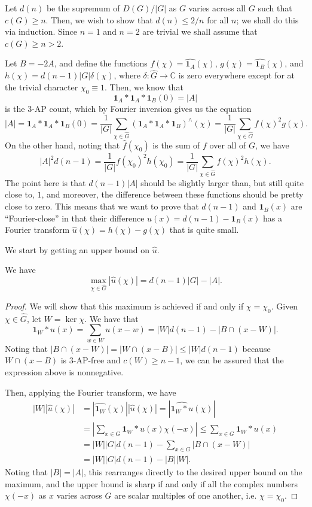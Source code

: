 \documentclass[10pt]{scrartcl}
\providecommand{\CC}{\mathbb C}
\providecommand{\ind}[1]{\mathbf 1_{#1}}
\providecommand{\abs}[1]{\left|{#1}\right|}
\renewcommand{\hat}{\widehat}
\begin{document}
Let $d(n)$ be the supremum of $D(G)/|G|$ as $G$ varies across all $G$
such that $c(G)\ge n$. Then, we wish to show that $d(n)\le 2/n$ for all $n$;
we shall do this via induction.
Since $n=1$ and $n=2$ are trivial we shall assume that $c(G)\ge n > 2$.

Let $B = -2A$, and define the functions $f(\chi) = \hat{\ind A}(\chi)$,
$g(\chi) = \hat{\ind B}(\chi)$, and $h(\chi) = d(n-1)|G|\delta(\chi)$,
where $\delta\colon\hat G\to\CC$ is zero everywhere except for at
the trivial character $\chi_0\equiv 1$. Then, we know that
\[\ind A*\ind A*\ind B(0) = |A|\]
is the 3-AP count, which by Fourier inversion gives us the equation
\[|A| = \ind A*\ind A*\ind B(0)
= \frac{1}{|G|}\sum_{\chi\in\hat G}(\ind A*\ind A*\ind B)^\wedge(\chi)
= \frac{1}{|G|}\sum_{\chi\in\hat G}f(\chi)^2g(\chi).\]
On the other hand, noting that $\hat f(\chi_0)$ is the sum of $f$
over all of $G$, we have
\[|A|^2d(n-1) = \frac{1}{|G|}f(\chi_0)^2h(\chi_0)
= \frac{1}{|G|}\sum_{\chi\in\hat G}f(\chi)^2h(\chi).\]
The point here is that $d(n-1)|A|$ should be slightly larger than,
but still quite close to, $1$, and moreover, the difference
between these functions should be pretty close to zero.
This means that we want to prove that $d(n-1)$ and $\ind B(x)$
are ``Fourier-close'' in that their difference $u(x) = d(n-1) - \ind B(x)$
has a Fourier transform $\hat u(\chi) = h(\chi) - g(\chi)$ that is quite small.

We start by getting an upper bound on $\hat u$.

\begin{prop}
	We have
	\[\max_{\chi\in\hat G}|\hat u(\chi)| = d(n-1)|G| - |A|.\]
\end{prop}

\begin{proof}
	We will show that this maximum is achieved if and only if
	$\chi = \chi_0$. Given $\chi\in\hat G$, let $W = \ker\chi$.
	We have that
	\[\ind W*u(x) = \sum_{w\in W}u(x-w) = |W|d(n-1) - |B\cap(x-W)|.\]
	Noting that $|B\cap(x-W)| = |W\cap(x-B)|\le |W|d(n-1)$
	because $W\cap(x-B)$ is 3-AP-free and $c(W)\ge n-1$,
	we can be assured that the expression above is nonnegative.
	
	Then, applying the Fourier transform, we have
	\begin{align*}
		|W||\hat u(\chi)| &= |\hat{\ind W}(\chi)||\hat u(\chi)|
		= |\hat{\ind W*u}(\chi)|\\
		&=\abs{\sum_{x\in G}\ind W*u(x)\chi(-x)}
		\le \sum_{x\in G} \ind W*u(x)\\
		&= |W||G|d(n-1) - \sum_{x\in G} |B\cap (x-W)|\\
		&= |W||G|d(n-1) - |B||W|.
	\end{align*}
	Noting that $|B| = |A|$, this rearranges directly to
	the desired upper bound on the maximum,
	and the upper bound is sharp if and only if all the
	complex numbers $\chi(-x)$ as $x$ varies across $G$
	are scalar multiples of one another, i.e. $\chi = \chi_0$.
\end{proof}
\end{document}
